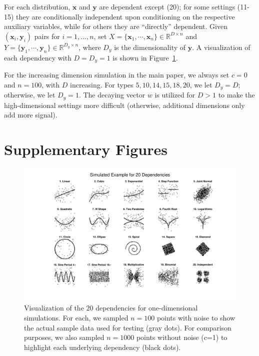 \documentclass[11pt]{article}
\providecommand{\mb}[1]{\boldsymbol{#1}}
\newcommand{\Real}{\mathbb{R}}
\newcommand{\mby}{\ensuremath{\mb{y}}}
\begin{document}
For each distribution, $\mb{x}$ and $\mb{y}$ are dependent except  (20); for some settings (11-15) they are conditionally independent upon conditioning on the respective auxiliary variables, while for others they are
 ``directly'' dependent. 
 Given $(\mb{x}_{i},\mb{y}_{i})$ pairs for $i=1,\ldots,n$, set $X=\{\mb{x}_{1},\cdots, \mb{x}_{n}\} \in \Real^{D \times n}$ and $Y=\{\mb{y}_{1},\cdots, \mb{y}_{n}\} \in \Real^{D_y \times n}$, where $D_y$ is the dimensionality of \mby. A visualization of each dependency with $D=D_y=1$ is shown in Figure~\ref{f:dependencies}.


For the increasing dimension simulation in the main paper, we always set $c=0$ and $n=100$, with $D$ increasing.  For types  $5,10,14,15,18,20$, we let $D_y=D$; otherwise, we let $D_y=1$. 
The decaying vector $w$ is utilized for $D>1$ to make the high-dimensional settings more difficult (otherwise, additional dimensions only add more signal).


\section{Supplementary Figures}
\label{appen:figs}





\begin{figure}[htbp]
\includegraphics[trim={5cm 0 3.5cm 0},clip, width=1.0\textwidth]{Figures/FigSimVisual}
\caption{Visualization of the $20$ dependencies for one-dimensional simulations. For each, we sampled $n=100$ points with noise to show the actual sample data used for testing (gray dots). For comparison purposes, we also sampled $n=1000$ points without noise (c=1) to highlight each underlying dependency (black dots).
}
\label{f:dependencies}
\end{figure}
\end{document}
